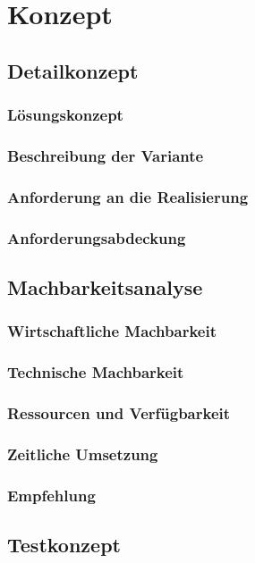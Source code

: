 \chapter{Konzept}
\section{Detailkonzept}
\subsection{Lösungskonzept}
\begin{comment}
Hier muss schon relativ genau beschrieben werden wie das Netzwerk und die Hardware aussieht und wie die Lösung am Schluss abgeliefert werden soll.
\end{comment}
\subsection{Beschreibung der Variante}
\subsection{Anforderung an die Realisierung}
\subsection{Anforderungsabdeckung}
\section{Machbarkeitsanalyse}
\subsection{Wirtschaftliche Machbarkeit}
\subsection{Technische Machbarkeit}
\subsection{Ressourcen und Verfügbarkeit}
\subsection{Zeitliche Umsetzung}
\subsection{Empfehlung}
\section{Testkonzept}
